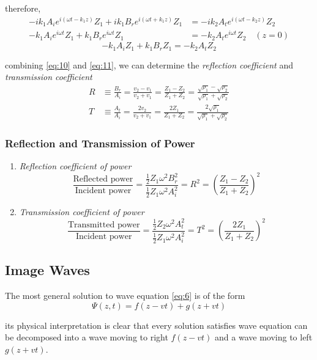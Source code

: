 \documentclass[UTF8]{book}
\begin{document}
therefore,
\begin{align*}
-ik_1A_ie^{i(\omega t-k_1z)}Z_1+ik_1B_re^{i(\omega t+k_1z)}Z_1&=-ik_2A_te^{i(\omega t-k_2z)}Z_2\\
-k_1A_ie^{i\omega t}Z_1+k_1B_re^{i\omega t}Z_1&=-k_2A_te^{i\omega t}Z_2\quad (z=0)
\end{align*}
\begin{equation}\label{eq:11}
-k_1A_iZ_1+k_1B_rZ_1=-k_2A_tZ_2
\end{equation}

combining \eqref{eq:10} and \eqref{eq:11}, we can determine the \emph{reflection coefficient} and \emph{transmission coefficient}
\begin{align*}
R&\equiv \frac{B_r}{A_i}=\frac{v_2-v_1}{v_2+v_1}=\frac{Z_1-Z_2}{Z_1+Z_2}=\frac{\sqrt{\rho _1}-\sqrt{\rho _2}}{\sqrt{\rho _1}+\sqrt{\rho _2}}\\
T&\equiv \frac{A_t}{A_i}=\frac{2v_2}{v_2+v_1}=\frac{2Z_1}{Z_1+Z_2}=\frac{2\sqrt{\rho _1}}{\sqrt{\rho _1}+\sqrt{\rho _2}}
\end{align*}


\subsubsection{Reflection and Transmission of Power}
\begin{enumerate}
\item \emph{Reflection coefficient of power}
\[\frac{\text{Reflected power}}{\text{Incident power}}=\frac{\frac{1}{2}Z_1\omega ^2B_r^2}{\frac{1}{2}Z_1\omega ^2A_i^2}=R^2=\left(\frac{Z_1-Z_2}{Z_1+Z_2}\right)^2\]
\item \emph{Transmission coefficient of power}
\[\frac{\text{Transmitted power}}{\text{Incident power}}=\frac{\frac{1}{2}Z_2\omega ^2A_t^2}{\frac{1}{2}Z_1\omega ^2A_i^2}=T^2=\left(\frac{2Z_1}{Z_1+Z_2}\right)^2\]
\end{enumerate}


\subsection{Image Waves}
The most general solution to wave equation  \eqref{eq:6} is of the form
\[\Psi (z,t)=f(z-vt)+g(z+vt)\]

its physical interpretation is clear that every solution satisfies wave equation can be decomposed into a wave moving to right $f(z-vt)$ and a wave moving to left $g(z+vt)$.
\end{document}
